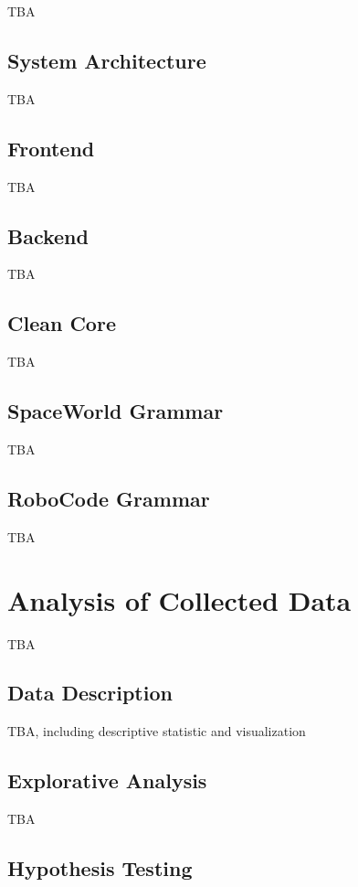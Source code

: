 \documentclass[
    digital,
    color,
    11pt,
    nocover,
    table,  %
    nolof,  %
    nolot,  %
    microtype,
]{fithesis3}
\begin{document}
TBA

\section{System Architecture}

TBA

\section{Frontend}

TBA


\section{Backend}

TBA

\section{Clean Core}

TBA


\section{SpaceWorld Grammar}

TBA


\section{RoboCode Grammar}

TBA


\chapter{Analysis of Collected Data}
\label{chap:analysis}

TBA

\section{Data Description}

TBA, including descriptive statistic and visualization


\section{Explorative Analysis}

TBA


\section{Hypothesis Testing}
\end{document}
